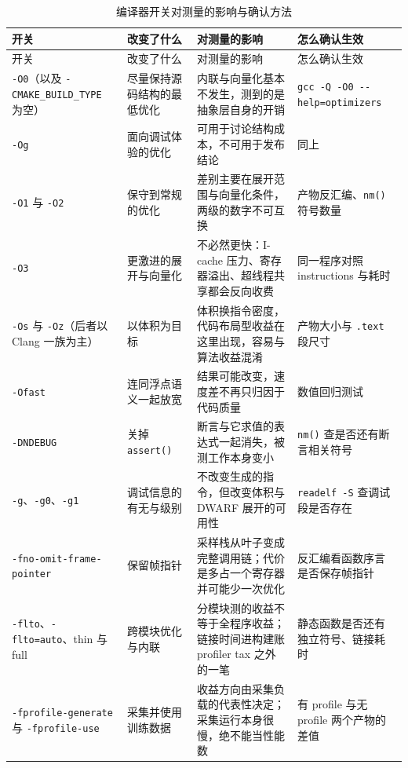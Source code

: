 \documentclass[12pt,a4paper,fontset=fandol]{ctexbook}
\newcommand{\Fn}[1]{\texttt{#1()}}
\newcommand{\Tp}[1]{\texttt{#1}}
\newcommand{\Bk}{\discretionary{}{}{}}
\newcommand{\Mx}[1]{\textsf{#1}}
\begin{document}
\begin{longtable}{>{\raggedright\arraybackslash}p{} >{\raggedright\arraybackslash}p{} >{\raggedright\arraybackslash}p{} >{\raggedright\arraybackslash}p{}}
\caption{编译器开关对测量的影响与确认方法}\label{tab:pmapB-ccflag}\\
\toprule
开关 & 改变了什么 & 对测量的影响 & 怎么确认生效 \\
\midrule
\endfirsthead
\toprule
开关 & 改变了什么 & 对测量的影响 & 怎么确认生效 \\
\midrule
\endhead
\bottomrule
\endlastfoot
\Tp{-O0}（以及 \Tp{-{\Bk}CMAKE\_{\Bk}BUILD\_{\Bk}TYPE} 为空） & 尽量保持源码结构的最低优化 & 内联与向量化基本不发生，测到的是抽象层自身的开销 & \Tp{gcc -{\Bk}Q -{\Bk}O0 -{\Bk}-{\Bk}help={\Bk}optimizers} \\
\Tp{-Og} & 面向调试体验的优化 & 可用于讨论结构成本，不可用于发布结论 & 同上 \\
\Tp{-O1} 与 \Tp{-O2} & 保守到常规的优化 & 差别主要在展开范围与向量化条件，两级的数字不可互换 & 产物反汇编、\Fn{nm} 符号数量 \\
\Tp{-O3} & 更激进的展开与向量化 & 不必然更快：I-cache 压力、寄存器溢出、超线程共享都会反向收费 & 同一程序对照 \Mx{instructions} 与耗时 \\
\Tp{-Os} 与 \Tp{-Oz}（后者以 Clang 一族为主） & 以体积为目标 & 体积换指令密度，代码布局型收益在这里出现，容易与算法收益混淆 & 产物大小与 \Tp{.text} 段尺寸 \\
\Tp{-Ofast} & 连同浮点语义一起放宽 & 结果可能改变，速度差不再只归因于代码质量 & 数值回归测试 \\
\Tp{-DNDEBUG} & 关掉 \Fn{assert} & 断言与它求值的表达式一起消失，被测工作本身变小 & \Fn{nm} 查是否还有断言相关符号 \\
\Tp{-g}、\Tp{-g0}、\Tp{-g1} & 调试信息的有无与级别 & 不改变生成的指令，但改变体积与 DWARF 展开的可用性 & \Tp{readelf -{\Bk}S} 查调试段是否存在 \\
\Tp{-{\Bk}fno-{\Bk}omit-{\Bk}frame-{\Bk}pointer} & 保留帧指针 & 采样栈从叶子变成完整调用链；代价是多占一个寄存器并可能少一次优化 & 反汇编看函数序言是否保存帧指针 \\
\Tp{-flto}、\Tp{-{\Bk}flto={\Bk}auto}、thin 与 full & 跨模块优化与内联 & 分模块测的收益不等于全程序收益；链接时间进构建账 \Mx{profiler tax} 之外的一笔 & 静态函数是否还有独立符号、链接耗时 \\
\Tp{-{\Bk}fprofile-{\Bk}generate} 与 \Tp{-{\Bk}fprofile-{\Bk}use} & 采集并使用训练数据 & 收益方向由采集负载的代表性决定；采集运行本身很慢，绝不能当性能数 & 有 profile 与无 profile 两个产物的差值 \\

\end{longtable}
\end{document}
